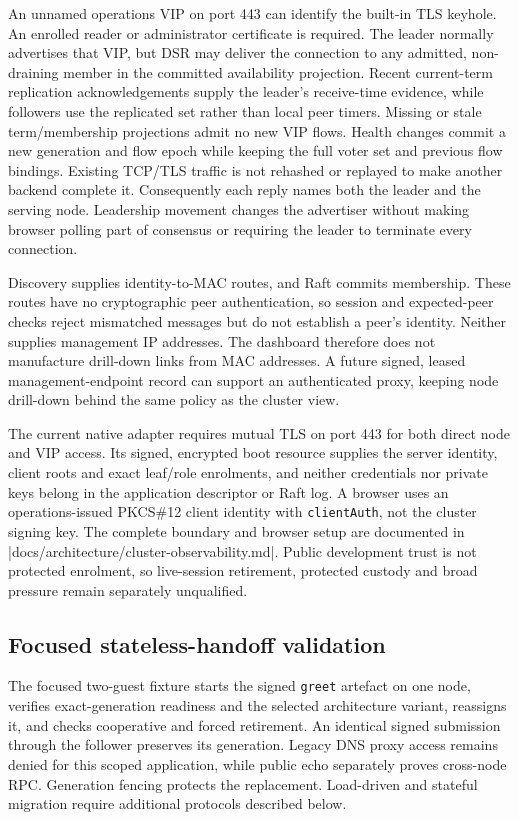An unnamed operations VIP on port 443 can identify the built-in TLS keyhole.
An enrolled reader or administrator certificate is required. The
leader normally advertises that VIP, but DSR may deliver the connection to any
admitted, non-draining member in the committed availability projection. Recent
current-term replication acknowledgements supply the leader's receive-time
evidence, while followers use the replicated set rather than local peer timers.
Missing or stale term/membership projections admit no new VIP flows. Health
changes commit a new generation and flow epoch while keeping the full voter
set and previous flow bindings. Existing TCP/TLS traffic is not rehashed or
replayed to make another backend complete it. Consequently each reply names both the leader
and the serving node. Leadership movement changes the advertiser without
making browser polling part of consensus or requiring the leader to terminate
every connection.

Discovery supplies identity-to-MAC routes, and Raft commits membership. These
routes have no cryptographic peer authentication, so session and expected-peer
checks reject mismatched messages but do not establish a peer's identity.
Neither supplies management IP addresses. The dashboard therefore does
not manufacture drill-down links from MAC addresses. A future signed, leased
management-endpoint record can support an authenticated
 proxy, keeping node drill-down
behind the same policy as the cluster view.

The current native adapter requires mutual TLS on port 443 for both direct
node and VIP access. Its signed, encrypted boot resource supplies the server
identity, client roots and exact leaf/role enrolments, and neither credentials nor
private keys belong in the application descriptor or Raft log. A browser
uses an operations-issued PKCS\#12 client identity with \texttt{clientAuth},
not the cluster signing key. The complete boundary and browser setup are
documented in \repofile|docs/architecture/cluster-observability.md|. Public
development trust is not protected enrolment, so live-session retirement,
protected custody and broad pressure remain separately unqualified.

\subsection{Focused stateless-handoff validation}

The focused two-guest fixture starts the signed \texttt{greet} artefact on one
node, verifies exact-generation readiness and the selected architecture variant,
reassigns it, and checks cooperative and forced retirement. An identical signed
submission through the follower preserves its generation. Legacy DNS proxy
access remains denied for this scoped application, while public echo separately proves
cross-node RPC. Generation fencing protects the replacement. Load-driven and
stateful migration require additional protocols described below.

